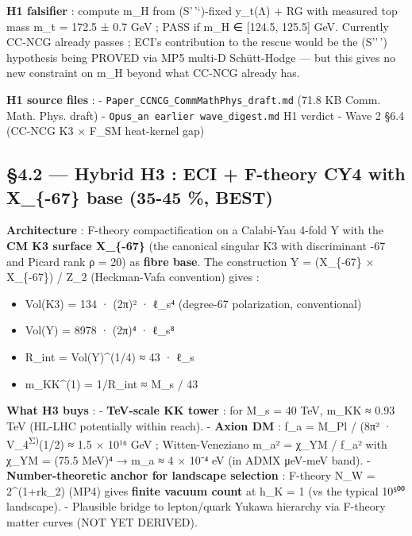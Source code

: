 \documentclass[
  11pt,
  a4paper,
]{article}
\providecommand{\tightlist}{\setlength{\itemsep}{0pt}\setlength{\parskip}{0pt}}
\providecommand{\tightlist}{%
  \setlength{\itemsep}{0pt}\setlength{\parskip}{0pt}}
\begin{document}
\textbf{H1 falsifier} : compute m\_H from (S'\,'`)-fixed y\_t(Λ) + RG with measured top mass m\_t = 172.5 ± 0.7 GeV ; PASS if m\_H ∈ {[}124.5, 125.5{]} GeV. Currently CC-NCG already passes ; ECI's contribution to the rescue would be the (S''\,') hypothesis being PROVED via MP5 multi-D Schütt-Hodge --- but this gives no new constraint on m\_H beyond what CC-NCG already has.

\textbf{H1 source files} :
- \texttt{Paper\_CCNCG\_CommMathPhys\_draft.md} (71.8 KB Comm. Math. Phys. draft)
- \texttt{Opus\_an earlier wave\_digest.md} H1 verdict
- Wave 2 §6.4 (CC-NCG K3 × F\_SM heat-kernel gap)

\hypertarget{hybrid-h3-eci-f-theory-cy4-with-x_-67-base-35-45-best}{%
\subsection{§4.2 --- Hybrid H3 : ECI + F-theory CY4 with X\_\{-67\} base (35-45 \%, BEST)}\label{hybrid-h3-eci-f-theory-cy4-with-x_-67-base-35-45-best}}

\textbf{Architecture} : F-theory compactification on a Calabi-Yau 4-fold Y with the \textbf{CM K3 surface X\_\{-67\}} (the canonical singular K3 with discriminant -67 and Picard rank ρ = 20) as \textbf{fibre base}. The construction Y = (X\_\{-67\} × X\_\{-67\}) / Z\_2 (Heckman-Vafa convention) gives :

\begin{itemize}
\tightlist
\item
  Vol(K3) = 134 · (2π)² · ℓ\_s⁴ (degree-67 polarization, conventional)
\item
  Vol(Y) = 8978 · (2π)⁴ · ℓ\_s⁸
\item
  R\_int = Vol(Y)\^{}(1/4) ≈ 43 · ℓ\_s
\item
  m\_KK\^{}(1) = 1/R\_int ≈ M\_s / 43
\end{itemize}

\textbf{What H3 buys} :
- \textbf{TeV-scale KK tower} : for M\_s = 40 TeV, m\_KK ≈ 0.93 TeV (HL-LHC potentially within reach).
- \textbf{Axion DM} : f\_a = M\_Pl / (8π² · V\_4\textsuperscript{Σ)}(1/2) ≈ 1.5 × 10¹⁶ GeV ; Witten-Veneziano m\_a² = χ\_YM / f\_a² with χ\_YM = (75.5 MeV)⁴ → m\_a ≈ 4 × 10⁻⁴ eV (in ADMX μeV-meV band).
- \textbf{Number-theoretic anchor for landscape selection} : F-theory N\_W = 2\^{}(1+rk\_2) (MP4) gives \textbf{finite vacuum count} at h\_K = 1 (vs the typical 10⁵⁰⁰ landscape).
- Plausible bridge to lepton/quark Yukawa hierarchy via F-theory matter curves (NOT YET DERIVED).
\end{document}
